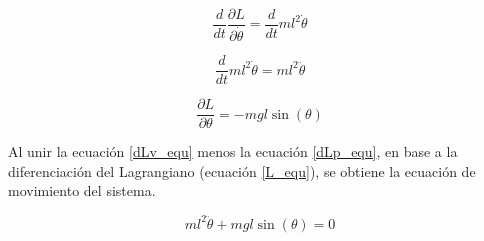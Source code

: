 \begin{large}
\begin{equation*}
\dfrac{d}{dt} \dfrac{\partial L}{\partial \dot{\theta}} = \dfrac{d}{dt} ml^2\dot{\theta}
\end{equation*}
\end{large}
\begin{large}
\begin{equation} \label{dLv_equ}
\dfrac{d}{dt} ml^2\dot{\theta} = ml^2\ddot{\theta}
\end{equation}
\end{large}
\begin{large}
\begin{equation} \label{dLp_equ}
\dfrac{\partial L}{\partial\theta} = -mgl\sin(\theta)
\end{equation}
\end{large}
Al unir la ecuación \ref{dLv_equ} menos la ecuación \ref{dLp_equ}, en base a la diferenciación del Lagrangiano (ecuación \ref{L_equ}), se obtiene la ecuación de movimiento del sistema.
\begin{large}
\begin{equation}
ml^2\ddot{\theta} + mgl\sin(\theta) = 0
\end{equation}
\end{large}
